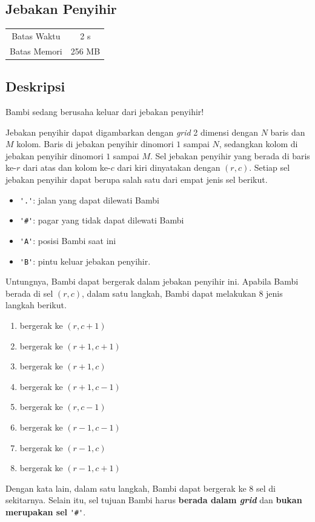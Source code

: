 \documentclass{article}
\begin{document}
\begin{center}
    \section*{Jebakan Penyihir} %

    \begin{tabular}{ | c c | }
        \hline
        Batas Waktu  & 2 s \\    %
        Batas Memori & 256 MB \\  %
        \hline
    \end{tabular}
\end{center}

\subsection*{Deskripsi}
Bambi sedang berusaha keluar dari jebakan penyihir!

Jebakan penyihir dapat digambarkan dengan \textit{grid} 2 dimensi dengan $N$ baris dan $M$ kolom. Baris di jebakan penyihir dinomori $1$ sampai $N$, sedangkan kolom di jebakan penyihir dinomori $1$ sampai $M$. Sel jebakan penyihir yang berada di baris ke-$r$ dari atas dan kolom ke-$c$ dari kiri dinyatakan dengan $(r, c)$. Setiap sel jebakan penyihir dapat berupa salah satu dari empat jenis sel berikut.
\begin{itemize}
    \item \verb|'.'|: jalan yang dapat dilewati Bambi
    \item \verb|'#'|: pagar yang tidak dapat dilewati Bambi
    \item \verb|'A'|: posisi Bambi saat ini
    \item \verb|'B'|: pintu keluar jebakan penyihir.
\end{itemize}

Untungnya, Bambi dapat bergerak dalam jebakan penyihir ini. Apabila Bambi berada di sel $(r,c)$, dalam satu langkah, Bambi dapat melakukan 8 jenis langkah berikut.
\begin{enumerate}
    \item bergerak ke $(r, c+1)$
    \item bergerak ke $(r+1, c+1)$
    \item bergerak ke $(r+1, c)$
    \item bergerak ke $(r+1, c-1)$
    \item bergerak ke $(r, c-1)$
    \item bergerak ke $(r-1, c-1)$
    \item bergerak ke $(r-1, c)$
    \item bergerak ke $(r-1, c+1)$
\end{enumerate}
Dengan kata lain, dalam satu langkah, Bambi dapat bergerak ke $8$ sel di sekitarnya. Selain itu, sel tujuan Bambi harus \textbf{berada dalam \textit{grid}} dan \textbf{bukan merupakan sel} \verb|'#'|.
\end{document}
